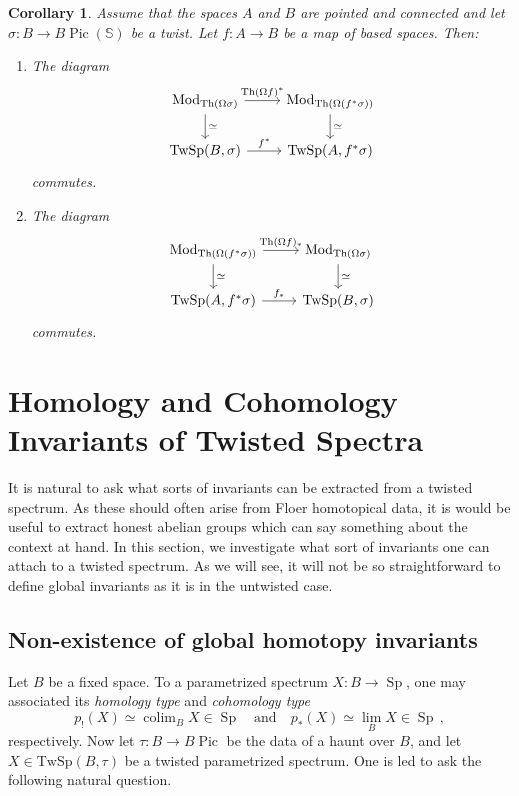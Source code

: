 \documentclass[10pt]{amsart}
\theoremstyle{plain}
\newtheorem{corollary}[theorem]{Corollary}
\theoremstyle{definition}
\DeclareMathOperator*{\colim}{colim}
\DeclareMathOperator{\Mod}{Mod}
\DeclareMathOperator{\Sp}{Sp}
\DeclareMathOperator{\Th}{Th}
\DeclareMathOperator{\Pic}{Pic}
\newcommand{\bS}{\mathbb{S}}
\newcommand{\TwSp}{\mathrm{TwSp}}
\newcommand{\och}{\quad \text{and} \quad}
\begin{document}
\begin{corollary}
  Assume that the spaces $A$ and $B$ are pointed and connected and let $\sigma : B \to B\Pic(\bS)$ be a twist.
  Let $f : A \to B$ be a map of based spaces. Then:
  \begin{enumerate}
    \item The diagram
      \[
      \begin{tikzcd}
        \Mod_{\Th(\Omega\sigma)} \arrow[r,"\Th(\Omega f)^*"] \arrow[d, "\simeq"] & \Mod_{\Th(\Omega(f^* \sigma))} \arrow[d,"\simeq"] \\
        \TwSp(B,\sigma) \arrow[r,"f^*"] & \TwSp(A,f^* \sigma)
      \end{tikzcd}
      \]
      commutes.
    \item The diagram
      \[
      \begin{tikzcd}
        \Mod_{\Th(\Omega(f^* \sigma))} \arrow[r,"\Th(\Omega f)_*"] \arrow[d,"\simeq"] & \Mod_{\Th(\Omega \sigma)} \arrow[d,"\simeq"] \\
        \TwSp(A, f^* \sigma) \arrow[r,"f_*"] & \TwSp(B,\sigma)
      \end{tikzcd}
      \]
      commutes.
  \end{enumerate}
\end{corollary}


\section{Homology and Cohomology Invariants of Twisted Spectra}

It is natural to ask what sorts of invariants can be extracted from a twisted spectrum. As these should often arise from Floer homotopical data, it is would be useful to extract honest abelian groups which can say something about the context at hand. In this section, we investigate what sort of invariants one can attach to a twisted spectrum. As we will see, it will not be so straightforward to define global invariants as it is in the untwisted case.

\subsection{Non-existence of global homotopy invariants}

Let $B$ be a fixed space.
To a parametrized spectrum $X : B \to \Sp$, one may associated its \emph{homology type} and \emph{cohomology type}
\[
p_!(X) \simeq \colim_{B}X \in \Sp \och p_*(X) \simeq \lim_{B}X \in \Sp \,,
\]
respectively.
Now let $\tau: B \to B \Pic$ be the data of a haunt over $B$, and let $X \in \TwSp(B, \tau)$ be a twisted parametrized spectrum.
One is led to ask the following natural question.
\end{document}
